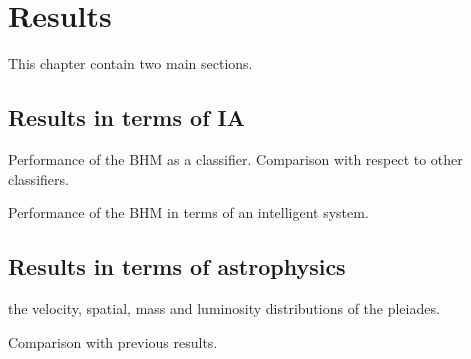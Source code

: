 \chapter{Results}
\label{chap:BHM}

This chapter contain two main sections.

\section{Results in terms of IA}
Performance of the BHM as a classifier. 
Comparison with respect to other classifiers.

Performance of the BHM in terms of an intelligent system.

\section{Results in terms of astrophysics}
the velocity, spatial, mass and luminosity distributions of the pleiades.

Comparison with previous results.

